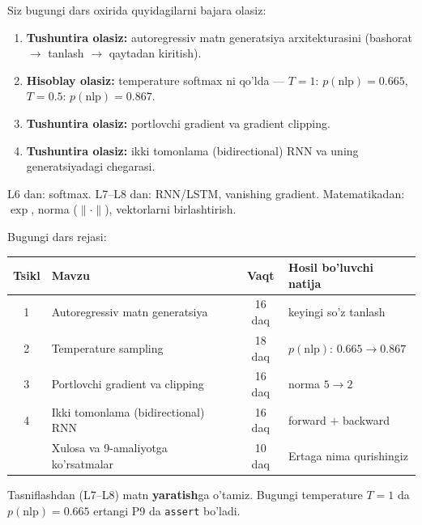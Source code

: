 \documentclass[aspectratio=169,11pt]{beamer}
\begin{document}
\begin{frame}{Siz bugungi dars oxirida quyidagilarni bajara olasiz:}
  \begin{enumerate}\setlength\itemsep{6pt}
    \item \textbf{Tushuntira olasiz:} autoregressiv matn generatsiya arxitekturasini
          (bashorat $\to$ tanlash $\to$ qaytadan kiritish).
    \item \textbf{Hisoblay olasiz:} temperature softmax ni qo'lda ---
          $T{=}1$: $p(\text{nlp}){=}0.665$, $T{=}0.5$: $p(\text{nlp}){=}0.867$.
    \item \textbf{Tushuntira olasiz:} portlovchi gradient va gradient clipping.
    \item \textbf{Tushuntira olasiz:} ikki tomonlama (bidirectional) RNN va uning
          generatsiyadagi chegarasi.
  \end{enumerate}
  \vspace{4pt}
  \begin{tcolorbox}[defbox,title=Oldindan talab]
    \footnotesize
    L6 dan: softmax. L7--L8 dan: RNN/LSTM, vanishing gradient. Matematikadan:
    $\exp$, norma ($\|\cdot\|$), vektorlarni birlashtirish.
  \end{tcolorbox}
\end{frame}

\begin{frame}{Bugungi dars rejasi:}
  \begin{center}
  \small
  \begin{tabular}{c p{5.0cm} c p{3.0cm}}
    \toprule
    \textbf{Tsikl}& \textbf{Mavzu} & \textbf{Vaqt} & \textbf{Hosil bo'luvchi natija}\\
    \midrule
    1 & Autoregressiv matn generatsiya & 16 daq & keyingi so'z tanlash \\
    2 & Temperature sampling & 18 daq & $p(\text{nlp})$: $0.665 \to 0.867$ \\
    3 & Portlovchi gradient va clipping & 16 daq & norma $5 \to 2$ \\
    4 & Ikki tomonlama (bidirectional) RNN & 16 daq & forward $+$ backward \\
    \midrule
      & Xulosa va 9-amaliyotga ko'rsatmalar & 10 daq & Ertaga nima qurishingiz \\
    \bottomrule
  \end{tabular}
  \end{center}
  \vspace{4pt}
  \begin{tcolorbox}[warnbox,title=Bu dars RNN ni ``ijodkor'' qiladi]
    \footnotesize\sloppy
    Tasniflashdan (L7--L8) matn \textbf{yaratish}ga o'tamiz. Bugungi temperature
    $T{=}1$ da $p(\text{nlp}){=}0.665$ ertangi P9 da \texttt{assert} bo'ladi.
  \end{tcolorbox}
\end{frame}
\end{document}
